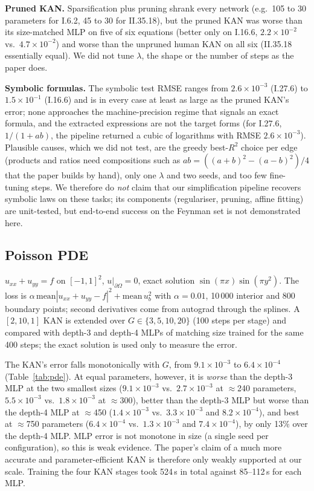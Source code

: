 \textbf{Pruned KAN.} Sparsification plus pruning shrank every network (e.g.\ 105 to 30 parameters for I.6.2, 45 to 30 for II.35.18), but the pruned KAN was worse than its size-matched MLP on five of six equations (better only on I.16.6, $2.2\times10^{-2}$ vs.\ $4.7\times10^{-2}$) and worse than the unpruned human KAN on all six (II.35.18 essentially equal). We did not tune $\lambda$, the shape or the number of steps as the paper does.

\textbf{Symbolic formulas.} The symbolic test RMSE ranges from $2.6\times10^{-3}$ (I.27.6) to $1.5\times10^{-1}$ (I.16.6) and is in every case at least as large as the pruned KAN's error; none approaches the machine-precision regime that signals an exact formula, and the extracted expressions are not the target forms (for I.27.6, $1/(1{+}ab)$, the pipeline returned a cubic of logarithms with RMSE $2.6\times10^{-3}$). Plausible causes, which we did not test, are the greedy best-$R^2$ choice per edge (products and ratios need compositions such as $ab=((a{+}b)^2-(a{-}b)^2)/4$ that the paper builds by hand), only one $\lambda$ and two seeds, and too few fine-tuning steps. We therefore do \emph{not} claim that our simplification pipeline recovers symbolic laws on these tasks; its components (regulariser, pruning, affine fitting) are unit-tested, but end-to-end success on the Feynman set is not demonstrated here.

\subsection{Poisson PDE}
$u_{xx}+u_{yy}=f$ on $[-1,1]^2$, $u|_{\partial\Omega}=0$, exact solution $\sin(\pi x)\sin(\pi y^2)$. The loss is $\alpha\,\mathrm{mean}|u_{xx}{+}u_{yy}{-}f|^2+\mathrm{mean}\,u_b^2$ with $\alpha{=}0.01$, 10\,000 interior and 800 boundary points; second derivatives come from autograd through the splines. A $[2,10,1]$ KAN is extended over $G\in\{3,5,10,20\}$ (100 steps per stage) and compared with depth-3 and depth-4 MLPs of matching size trained for the same 400 steps; the exact solution is used only to measure the error.

The KAN's error falls monotonically with $G$, from $9.1\times10^{-3}$ to $6.4\times10^{-4}$ (Table~\ref{tab:pde}). At equal parameters, however, it is \emph{worse} than the depth-3 MLP at the two smallest sizes ($9.1\times10^{-3}$ vs.\ $2.7\times10^{-3}$ at $\approx$240 parameters, $5.5\times10^{-3}$ vs.\ $1.8\times10^{-3}$ at $\approx$300), better than the depth-3 MLP but worse than the depth-4 MLP at $\approx$450 ($1.4\times10^{-3}$ vs.\ $3.3\times10^{-3}$ and $8.2\times10^{-4}$), and best at $\approx$750 parameters ($6.4\times10^{-4}$ vs.\ $1.3\times10^{-3}$ and $7.4\times10^{-4}$), by only 13\% over the depth-4 MLP. MLP error is not monotone in size (a single seed per configuration), so this is weak evidence. The paper's claim of a much more accurate and parameter-efficient KAN is therefore only weakly supported at our scale. Training the four KAN stages took 524\,s in total against 85--112\,s for each MLP.

